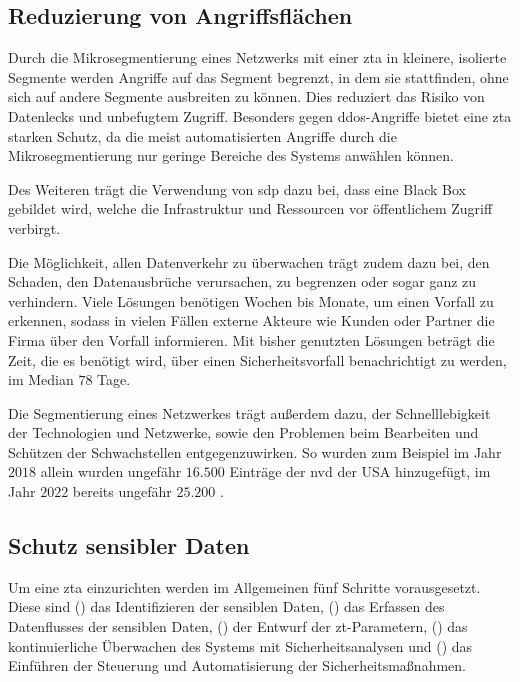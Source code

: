 \subsection{Reduzierung von Angriffsflächen}\label{subsec:reduzierung-von-angriffsflachen}
Durch die Mikrosegmentierung eines Netzwerks mit einer \ac{zta} in kleinere, isolierte Segmente werden Angriffe auf das Segment begrenzt, in dem sie stattfinden, ohne sich auf andere Segmente ausbreiten zu können.
Dies reduziert das Risiko von Datenlecks und unbefugtem Zugriff.\autocites[\vglf][]{shore-2021}[\vglf][]{buck-2021}
Besonders gegen \ac{ddos}-Angriffe bietet eine \ac{zta} starken Schutz, da die meist automatisierten Angriffe durch die Mikrosegmentierung nur geringe Bereiche des Systems anwählen können.\autocite[\vglf][]{Eidle-2017}

Des Weiteren trägt die Verwendung von \ac{sdp} dazu bei, dass eine Black Box gebildet wird, welche die Infrastruktur und Ressourcen vor öffentlichem Zugriff verbirgt.\autocites[\vglf][]{buck-2021}[\vglf][]{kumar-2019}

Die Möglichkeit, allen Datenverkehr zu überwachen trägt zudem dazu bei, den Schaden, den Datenausbrüche verursachen, zu begrenzen oder sogar ganz zu verhindern.\autocite[\vglf][]{cunningham-2019}
Viele Lösungen benötigen Wochen bis Monate, um einen Vorfall zu erkennen, sodass in vielen Fällen externe Akteure wie Kunden oder Partner die Firma über den Vorfall informieren.\autocite[\vglf][]{cunningham-2019}
Mit bisher genutzten Lösungen beträgt die Zeit, die es benötigt wird, über einen Sicherheitsvorfall benachrichtigt zu werden, im Median $78$ Tage.\autocite[\vglf][]{fireeye-2019}

Die Segmentierung eines Netzwerkes trägt außerdem dazu, der Schnelllebigkeit der Technologien und Netzwerke, sowie den Problemen beim Bearbeiten und Schützen der Schwachstellen entgegenzuwirken.
So wurden zum Beispiel im Jahr $2018$ allein wurden ungefähr $16.500$ Einträge der \ac{nvd} der USA hinzugefügt, im Jahr $2022$ bereits ungefähr $25.200$ \autocites[\vglf][]{cunningham-2019}[\vglf][]{cve-2023}.

\subsection{Schutz sensibler Daten}\label{subsec:schutz-sensibler-daten}
Um eine \ac{zta} einzurichten werden im Allgemeinen fünf Schritte vorausgesetzt.
Diese sind () das Identifizieren der sensiblen Daten, () das Erfassen des Datenflusses der sensiblen Daten, () der Entwurf der \ac{zt}-Parametern, () das kontinuierliche Überwachen des Systems mit Sicherheitsanalysen und () das Einführen der Steuerung und Automatisierung der Sicherheitsmaßnahmen.\autocites[\vglf][-3]{ahmed-2020}[\vglf][]{balaouras-2023}

